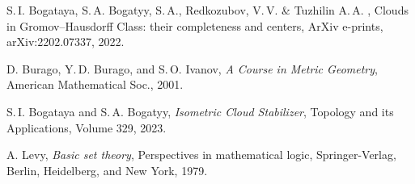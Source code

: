 \documentclass[leqno]{article}
\begin{document}
\begin{thebibliography}{99}
S.\,I. Bogataya, S.\,A. Bogatyy, S.\,A., Redkozubov, V.\,V. \& Tuzhilin A.\,A. , Clouds in Gromov--Hausdorff Class: their completeness and centers, ArXiv e-prints, arXiv:2202.07337, 2022.

D. Burago, Y.\,D. Burago, and S.\,O. Ivanov, \emph{A Course in Metric Geometry}, American Mathematical Soc., 2001.

S.\,I. Bogataya and S.\,A. Bogatyy, \emph{Isometric Cloud Stabilizer}, Topology and its Applications, Volume 329, 2023.

A. Levy, \emph{Basic set theory}, Perspectives in mathematical logic, Springer-Verlag, Berlin, Heidelberg, and New York, 1979.

\end{thebibliography}
\end{document}
